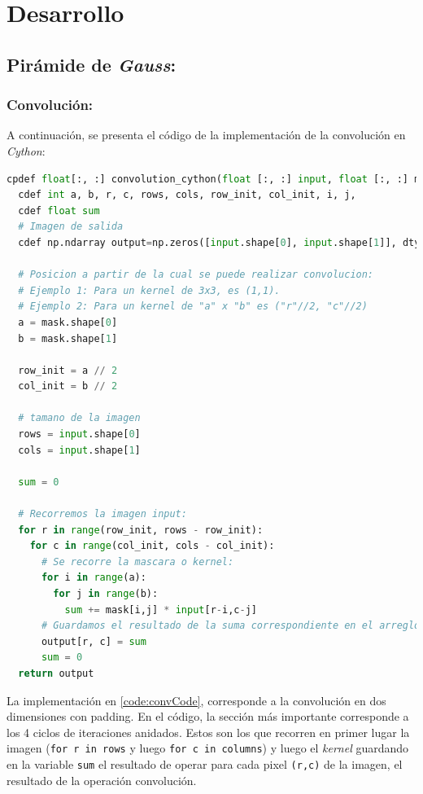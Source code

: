 \newpage
\section{Desarrollo}
\subsection{Pirámide de \textit{Gauss}:}

\subsubsection{Convolución:}
\par A continuación, se presenta el código de la implementación de la convolución en \textit{Cython}:

\begin{lstlisting}[language=Python, label = code:convCode, caption=Implementación de convolución en Cython.]
  cpdef float[:, :] convolution_cython(float [:, :] input, float [:, :] mask):
  cdef int a, b, r, c, rows, cols, row_init, col_init, i, j,
  cdef float sum
  # Imagen de salida
  cdef np.ndarray output=np.zeros([input.shape[0], input.shape[1]], dtype = np.float32)

  # Posicion a partir de la cual se puede realizar convolucion: 
  # Ejemplo 1: Para un kernel de 3x3, es (1,1).
  # Ejemplo 2: Para un kernel de "a" x "b" es ("r"//2, "c"//2)
  a = mask.shape[0]
  b = mask.shape[1]

  row_init = a // 2
  col_init = b // 2

  # tamano de la imagen
  rows = input.shape[0]
  cols = input.shape[1]

  sum = 0

  # Recorremos la imagen input:
  for r in range(row_init, rows - row_init):
    for c in range(col_init, cols - col_init):
      # Se recorre la mascara o kernel:
      for i in range(a):
        for j in range(b):
          sum += mask[i,j] * input[r-i,c-j]
      # Guardamos el resultado de la suma correspondiente en el arreglo output:
      output[r, c] = sum
      sum = 0
  return output
\end{lstlisting}

\par La implementación en \ref{code:convCode}, corresponde a la convolución en dos dimensiones con padding. En el código, la sección más importante corresponde a los 4 ciclos de iteraciones anidados. Estos son los que recorren en primer lugar la imagen (\texttt{for r in rows} y luego \texttt{for c in columns}) y luego el \textit{kernel} guardando en la variable \texttt{sum} el resultado de operar para cada pixel \texttt{(r,c)} de la imagen, el resultado de la operación convolución. 

